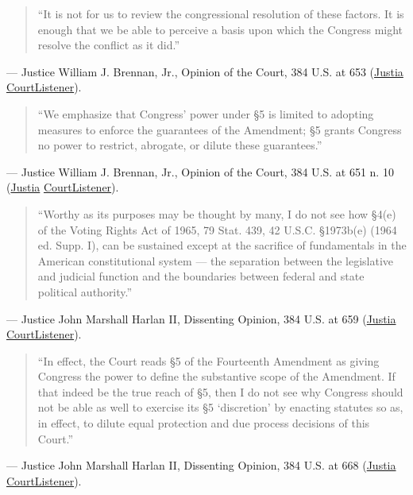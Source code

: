 \documentclass[12pt]{article}
\begin{document}
\begin{quote}
``It is not for us to review the congressional resolution of these factors. It is enough that we be able to perceive a basis upon which the Congress might resolve the conflict as it did.''
\end{quote}
\noindent --- Justice William J. Brennan, Jr., Opinion of the Court, 384 U.S. at 653 (\href{https://supreme.justia.com/cases/federal/us/384/641/}{Justia} \textbar{} \href{https://www.courtlistener.com/opinion/107256/katzenbach-v-morgan/}{CourtListener}).

\begin{quote}
``We emphasize that Congress' power under \S 5 is limited to adopting measures to enforce the guarantees of the Amendment; \S 5 grants Congress no power to restrict, abrogate, or dilute these guarantees.''
\end{quote}
\noindent --- Justice William J. Brennan, Jr., Opinion of the Court, 384 U.S. at 651 n. 10 (\href{https://supreme.justia.com/cases/federal/us/384/641/}{Justia} \textbar{} \href{https://www.courtlistener.com/opinion/107256/katzenbach-v-morgan/}{CourtListener}).

\begin{quote}
``Worthy as its purposes may be thought by many, I do not see how \S 4(e) of the Voting Rights Act of 1965, 79 Stat. 439, 42 U.S.C. \S 1973b(e) (1964 ed. Supp. I), can be sustained except at the sacrifice of fundamentals in the American constitutional system --- the separation between the legislative and judicial function and the boundaries between federal and state political authority.''
\end{quote}
\noindent --- Justice John Marshall Harlan II, Dissenting Opinion, 384 U.S. at 659 (\href{https://supreme.justia.com/cases/federal/us/384/641/}{Justia} \textbar{} \href{https://www.courtlistener.com/opinion/107256/katzenbach-v-morgan/}{CourtListener}).

\begin{quote}
``In effect, the Court reads \S 5 of the Fourteenth Amendment as giving Congress the power to define the substantive scope of the Amendment. If that indeed be the true reach of \S 5, then I do not see why Congress should not be able as well to exercise its \S 5 `discretion' by enacting statutes so as, in effect, to dilute equal protection and due process decisions of this Court.''
\end{quote}
\noindent --- Justice John Marshall Harlan II, Dissenting Opinion, 384 U.S. at 668 (\href{https://supreme.justia.com/cases/federal/us/384/641/}{Justia} \textbar{} \href{https://www.courtlistener.com/opinion/107256/katzenbach-v-morgan/}{CourtListener}).
\end{document}

